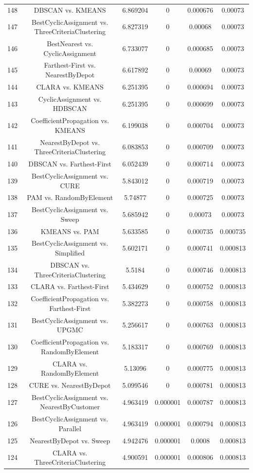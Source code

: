 \documentclass[a4paper,10pt]{article}
\begin{document}
\begin{landscape}
\begin{table}[!htp]
\begin{tabular}{cccccc}
148&DBSCAN vs. KMEANS&6.869204&0&0.000676&0.00073\\
147&BestCyclicAssignment vs. ThreeCriteriaClustering&6.827319&0&0.00068&0.00073\\
146&BestNearest vs. CyclicAssignment&6.733077&0&0.000685&0.00073\\
145&Farthest-First vs. NearestByDepot&6.617892&0&0.00069&0.00073\\
144&CLARA vs. KMEANS&6.251395&0&0.000694&0.00073\\
143&CyclicAssignment vs. HDBSCAN&6.251395&0&0.000699&0.00073\\
142&CoefficientPropagation vs. KMEANS&6.199038&0&0.000704&0.00073\\
141&NearestByDepot vs. ThreeCriteriaClustering&6.083853&0&0.000709&0.00073\\
140&DBSCAN vs. Farthest-First&6.052439&0&0.000714&0.00073\\
139&BestCyclicAssignment vs. CURE&5.843012&0&0.000719&0.00073\\
138&PAM vs. RandomByElement&5.74877&0&0.000725&0.00073\\
137&BestCyclicAssignment vs. Sweep&5.685942&0&0.00073&0.00073\\
136&KMEANS vs. PAM&5.633585&0&0.000735&0.000735\\
135&BestCyclicAssignment vs. Simplified&5.602171&0&0.000741&0.000813\\
134&DBSCAN vs. ThreeCriteriaClustering&5.5184&0&0.000746&0.000813\\
133&CLARA vs. Farthest-First&5.434629&0&0.000752&0.000813\\
132&CoefficientPropagation vs. Farthest-First&5.382273&0&0.000758&0.000813\\
131&BestCyclicAssignment vs. UPGMC&5.256617&0&0.000763&0.000813\\
130&CoefficientPropagation vs. RandomByElement&5.183317&0&0.000769&0.000813\\
129&CLARA vs. RandomByElement&5.13096&0&0.000775&0.000813\\
128&CURE vs. NearestByDepot&5.099546&0&0.000781&0.000813\\
127&BestCyclicAssignment vs. NearestByCustomer&4.963419&0.000001&0.000787&0.000813\\
126&BestCyclicAssignment vs. Parallel&4.963419&0.000001&0.000794&0.000813\\
125&NearestByDepot vs. Sweep&4.942476&0.000001&0.0008&0.000813\\
124&CLARA vs. ThreeCriteriaClustering&4.900591&0.000001&0.000806&0.000813\\

\end{tabular}
\end{table}
\end{landscape}
\end{document}

